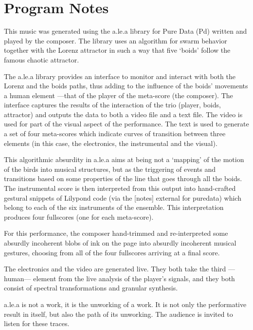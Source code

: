 \documentclass[
	12pt,
	letterpaper,
	oneside,
]{book}
\begin{document}
\section*{Program Notes}

This music was generated using the a.le.a library for Pure Data (Pd) written and played by the composer. The library uses an algorithm for swarm behavior together with the Lorenz attractor in such a way that five `boids' follow the famous chaotic attractor.

The a.le.a library provides an interface to monitor and interact with both the Lorenz and the boids paths, thus adding to the influence of the boids' movements a human element ---that of the player of the meta-score (the composer). The interface captures the results of the interaction of the trio (player, boids, attractor) and outputs the data to both a video file and a text file. The video is used for part of the visual aspect of the performance. The text is used to generate a set of four meta-scores which indicate curves of transition between three elements (in this case, the electronics, the instrumental and the visual).

This algorithmic absurdity in a.le.a aims at being not a `mapping' of the motion of the birds into musical structures, but as the triggering of events and transitions based on some properties of the line that goes through all the boids. The instrumental score is then interpreted from this output into hand-crafted gestural snippets of Lilypond code (via the [notes] external for puredata) which belong to each of the six instruments of the ensemble. This interpretation produces four fullscores (one for each meta-score).

For this performance, the composer hand-trimmed and re-interpreted some absurdly incoherent blobs of ink on the page into absurdly incoherent musical gestures, choosing from all of the four fullscores arriving at a final score.

The electronics and the video are generated live. They both take the third ---human--- element from the live analysis of the player's signals, and they both consist of spectral transformations and granular synthesis.

a.le.a is not a work, it is the unworking of a work. It is not only the performative result in itself, but also the path of its unworking. The audience is invited to listen for these traces.
\end{document}
